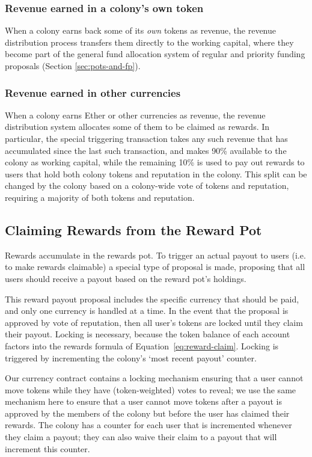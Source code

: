 \subsubsection*{Revenue earned in a colony's own token}
When a colony earns back some of its \emph{own} tokens as revenue, the revenue distribution process transfers them directly to the working capital, where they become part of the general fund allocation system of regular and priority funding proposals (Section \ref{sec:pots-and-fp}).

\subsubsection*{Revenue earned in other currencies}
When a colony earns Ether or other currencies as revenue, the revenue distribution system allocates some of them to be claimed as rewards. In particular, the special triggering transaction takes any such revenue that has accumulated since the last such transaction, and makes 90\% available to the colony as working capital, while the remaining 10\% is used to pay out rewards to users that hold both colony tokens and reputation in the colony. This split can be changed by the colony based on a colony-wide vote of tokens and reputation, requiring a majority of both tokens and reputation.

\subsection{Claiming Rewards from the Reward Pot}\label{sec:claimrewards}
Rewards accumulate in the rewards pot. To trigger an actual payout to users (i.e. to make rewards claimable) a special type of proposal is made, proposing that all users should receive a payout based on the reward pot's holdings. 

This reward payout proposal includes the specific currency that should be paid, and only one currency is handled at a time. In the event that the proposal is approved by vote of reputation, then all user's tokens are locked until they claim their payout. Locking is necessary, because the token balance of each account factors into the rewards formula of Equation~\eqref{eq:reward-claim}. Locking is triggered by incrementing the colony's `most recent payout' counter. 

Our currency contract contains a locking mechanism ensuring that a user cannot move tokens while they have (token-weighted) votes to reveal; we use the same mechanism here to ensure that a user cannot move tokens after a payout is approved by the members of the colony but before the user has claimed their rewards. The colony has a counter for each user that is incremented whenever they claim a payout; they can also waive their claim to a payout that will increment this counter.  

